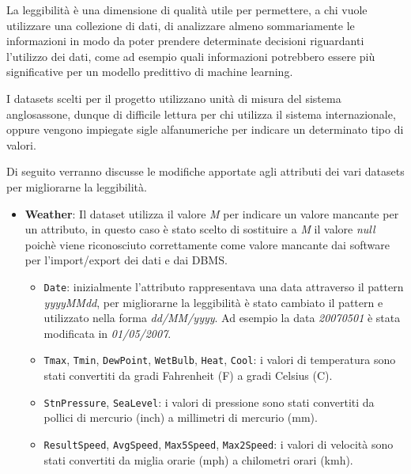 La leggibilità è una dimensione di qualità utile per permettere, a chi vuole 
utilizzare una collezione di dati, di analizzare almeno sommariamente le 
informazioni in modo da poter prendere determinate decisioni riguardanti 
l'utilizzo dei dati, come ad esempio quali informazioni potrebbero essere più 
significative per un modello predittivo di machine learning.

I datasets scelti per il progetto utilizzano unità di misura del 
sistema anglosassone, dunque di difficile lettura per chi utilizza il sistema 
internazionale, oppure vengono impiegate sigle alfanumeriche per indicare 
un determinato tipo di valori. 

Di seguito verranno discusse le modifiche 
apportate agli attributi dei vari datasets per migliorarne la leggibilità.

\begin{itemize}

    \item \textbf{Weather}: Il dataset utilizza il valore \textit{M} per 
        indicare un valore mancante per un attributo, in questo caso è stato 
        scelto di sostituire a \textit{M} il valore \textit{null} poichè viene 
        riconosciuto correttamente come valore mancante dai software per 
        l'import/export dei dati e dai DBMS.
        
        \begin{itemize}
            
            \item \texttt{Date}: inizialmente l'attributo rappresentava una 
                data attraverso il pattern \textit{yyyyMMdd}, per migliorarne 
                la leggibilità è stato cambiato il pattern e utilizzato nella 
                forma \textit{dd/MM/yyyy}. Ad esempio la data 
                \textit{20070501} è stata modificata in \textit{01/05/2007}.
        
            \item \texttt{Tmax}, \texttt{Tmin}, \texttt{DewPoint}, 
                \texttt{WetBulb}, \texttt{Heat}, \texttt{Cool}: i valori di 
                temperatura sono stati convertiti da gradi Fahrenheit (F) 
                a gradi Celsius (C).

            \item \texttt{StnPressure}, \texttt{SeaLevel}: i valori di 
                pressione sono stati convertiti da pollici di mercurio (inch) a 
                millimetri di mercurio (mm).

            \item \texttt{ResultSpeed}, \texttt{AvgSpeed}, \texttt{Max5Speed}, 
                \texttt{Max2Speed}: i valori di velocità sono stati convertiti 
                da miglia orarie (mph) a chilometri orari (kmh).
                

\end{itemize}
\end{itemize}
